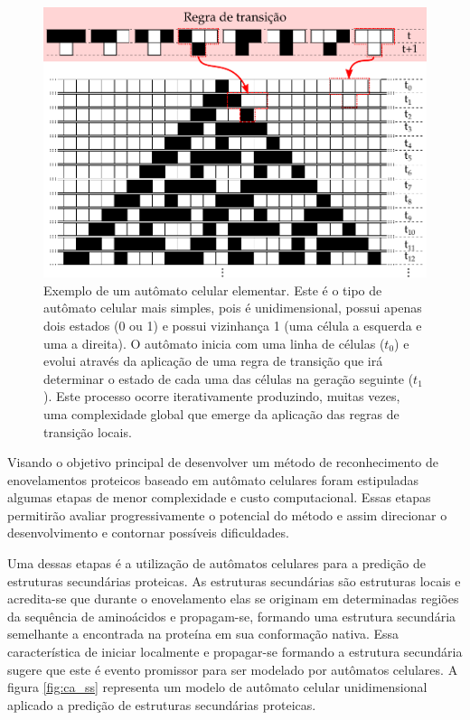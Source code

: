 \begin{figure}[h]
	\includegraphics[width=1\linewidth]{ca_final}
	\caption{Exemplo de um autômato celular elementar. Este é o tipo de autômato celular mais simples, pois é unidimensional, possui apenas dois estados (0 ou 1) e possui vizinhança 1 (uma célula a esquerda e uma a direita). O autômato inicia com uma linha de células ($t_{0}$) e evolui através da aplicação de uma regra de transição que irá determinar o estado de cada uma das células na geração seguinte ($t_{1}$). Este processo ocorre iterativamente produzindo, muitas vezes, uma complexidade global que emerge da aplicação das regras de transição locais.}
	\label{fig:ca}
\end{figure}

Visando o objetivo principal de desenvolver um método de reconhecimento de enovelamentos proteicos baseado em autômato celulares foram estipuladas algumas etapas de menor complexidade e custo computacional. Essas etapas permitirão avaliar progressivamente o potencial do método e assim direcionar o desenvolvimento e contornar possíveis dificuldades.

Uma dessas etapas é a utilização de autômatos celulares para a predição de estruturas secundárias proteicas. As estruturas secundárias são estruturas locais e acredita-se que durante o enovelamento elas se originam em determinadas regiões da sequência de aminoácidos e propagam-se, formando uma estrutura secundária semelhante a encontrada na proteína em sua conformação nativa. Essa característica de iniciar localmente e propagar-se formando a estrutura secundária sugere que este é evento promissor para ser modelado por autômatos celulares. A figura \ref{fig:ca_ss} representa um modelo de autômato celular unidimensional aplicado a predição de estruturas secundárias proteicas.

